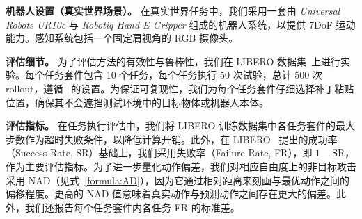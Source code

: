\textbf{机器人设置（真实世界场景）。} 
在真实世界任务中，我们采用一套由 \textit{Universal Robots UR10e} 与 \textit{Robotiq Hand-E Gripper} 组成的机器人系统，以提供 7DoF 运动能力。感知系统包括一个固定肩视角的 RGB 摄像头。

\textbf{评估细节。}
为了评估方法的有效性与鲁棒性，我们在 LIBERO 数据集~\cite{LIBREO}上进行实验。每个任务套件包含 10 个任务，每个任务执行 50 次试验，总计 500 次 rollout，遵循~\citet{kim24openvla} 的设置。为保证可复现性，我们为每个任务套件仔细选择补丁粘贴位置，确保其不会遮挡测试环境中的目标物体或机器人本体。

\textbf{评估指标。} 在任务执行评估中，我们将 LIBERO 训练数据集中各任务套件的最大步数作为超时失败条件，以降低计算开销。此外，在 LIBERO~\cite{LIBREO} 提出的成功率（Success Rate, SR）基础上，我们采用失败率（Failure Rate, FR），即 $1-\text{SR}$，作为主要评估指标。为了进一步量化动作偏差，我们对相应自由度上的非目标攻击采用 NAD（见式~\ref{formula:AD}），因为它通过相对距离来刻画与最优动作之间的偏移程度。更高的 NAD 值意味着真实动作与预测动作之间存在更大的偏差。此外，我们还报告每个任务套件内各任务 FR 的标准差。

